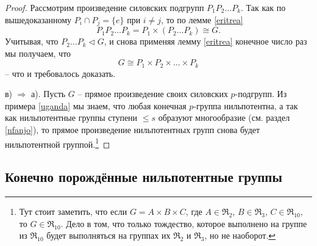 \documentclass{article}
\begin{document}
\begin{proof}
    Рассмотрим произведение силовских подгрупп $P_1 P_2 \ldots P_k$. Так как по вышедоказанному $P_i \cap P_j = \{ e \}$ при $i \neq j$, то по лемме \ref{eritrea}
    \[
        P_1 P_2 \ldots P_k = P_1 \times (P_2 \ldots P_k) \cong G.
    \]
    Учитывая, что $P_2 \ldots P_k \triangleleft G$, и снова применяя лемму \ref{eritrea} конечное число раз мы получаем, что
    \[
        G \cong P_1 \times P_2 \times \ldots \times P_k
    \]
    -- что и требовалось доказать.

    в) $\Rightarrow$ а). Пусть $G$ -- прямое произведение своих силовских $p$-подгрупп. Из примера \ref{uganda} мы знаем, что любая конечная $p$-группа нильпотентна, а так как нильпотентные группы ступени $\leqslant s$ образуют многообразие (см. раздел \ref{nfanjo}), то прямое произведение нильпотентных групп снова будет нильпотентной группой.\footnote{Тут стоит заметить, что если $G = A \times B \times C$, где $A \in \mathfrak{R}_2$, $B \in \mathfrak{R}_3$, $C \in \mathfrak{R}_{10}$, то $G \in \mathfrak{R}_{10}$. Дело в том, что только тождество, которое выполнено на группе из $\mathfrak{R}_{10}$ будет выполняться на группах их $\mathfrak{R}_2$ и $\mathfrak{R}_3$, но не наоборот.}
\end{proof}

\subsection{Конечно порождённые нильпотентные группы}
\end{document}
